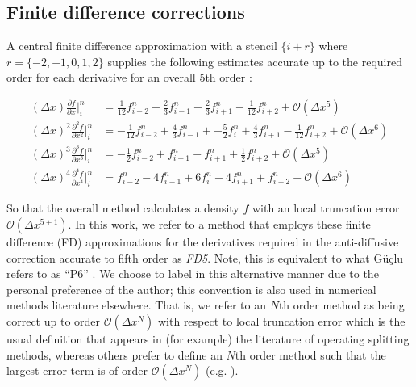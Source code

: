 \documentclass[11pt,titlepage]{report}
\begin{document}
\subsection{Finite difference corrections} \label{subsec:FD_implementation}

\indent\indent A central finite difference approximation with a stencil $\{i + r\}$ where $r = \{-2,-1,0,1,2\}$ supplies the following estimates accurate up to the required order for each derivative for an overall 5th order \cite{Fornberg88}:

\begin{subequations}
\label{eq:FD_deriv}
\begin{align}
(\Delta x)\frac{\partial f}{\partial x}\biggr|_i^n & =  \frac{1}{12}f_{i-2}^n - \frac{2}{3}f_{i-1}^n + \frac{2}{3}f_{i+1}^n - \frac{1}{12}f_{i+2}^n + \mathcal{O}(\Delta x^5) \\[0.3em]
(\Delta x)^2\frac{\partial^2 f}{\partial x^2}\biggr|_i^n & =  -\frac{1}{12}f_{i-2}^n + \frac{4}{3}f_{i-1}^n + - \frac{5}{2}f_i^n + \frac{4}{3}f_{i+1}^n - \frac{1}{12}f_{i+2}^n + \mathcal{O}(\Delta x^6) \\[0.3em]
(\Delta x)^3\frac{\partial^3 f}{\partial x^3}\biggr|_i^n & =  -\frac{1}{2}f_{i-2}^n + f_{i-1}^n - f_{i+1}^n + \frac{1}{2}f_{i+2}^n + \mathcal{O}(\Delta x^5) \\[0.3em]
(\Delta x)^4\frac{\partial^4 f}{\partial x^4}\biggr|_i^n & =  f_{i-2}^n -4f_{i-1}^n + 6f_i^n - 4f_{i+1}^n + f_{i+2}^n + \mathcal{O}(\Delta x^6) 
\end{align}
\end{subequations}

So that the overall method calculates a density $f$ with an local truncation error $\mathcal{O}(\Delta x^{5+1})$. In this work, we refer to a method that employs these finite difference (FD) approximations for the derivatives required in the anti-diffusive correction accurate to fifth order as \emph{FD5}. Note, this is equivalent to what G\"{u}\c{c}lu refers to as ``P6'' \cite{Guclu14}. We choose to label in this alternative manner due to the personal preference of the author; this convention is also used in numerical methods literature elsewhere. That is, we refer to an $N$th order method as being correct up to order $\mathcal{O}(\Delta x^N)$ with respect to local truncation error which is the usual definition that appears in (for example) the literature of operating splitting methods, whereas others prefer to define an $N$th order method such that the largest error term is of order $\mathcal{O}(\Delta x^N)$  (e.g. \cite{Guclu14}). 
\end{document}
